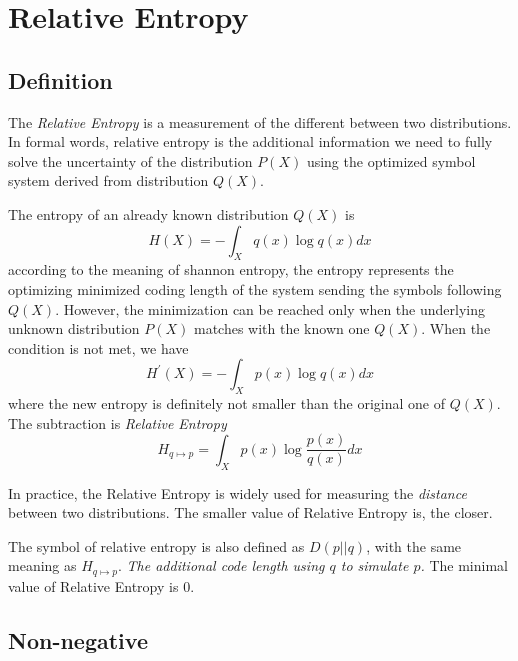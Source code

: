 \documentclass[a4paper]{article}
\begin{document}
\section{Relative Entropy}

\subsection{Definition}

The \emph{Relative Entropy} is a measurement of the different between two distributions.
In formal words, relative entropy is the additional information we need to fully solve the uncertainty of the distribution $P(X)$ using the optimized symbol system derived from distribution $Q(X)$.

The entropy of an already known distribution $Q(X)$ is
\begin{equation*}
    H(X) = - \int_{X} q(x) \log{q(x)} dx
\end{equation*}
according to the meaning of shannon entropy, the entropy represents the optimizing minimized coding length of the system sending the symbols following $Q(X)$.
However, the minimization can be reached only when the underlying unknown distribution $P(X)$ matches with the known one $Q(X)$.
When the condition is not met, we have
\begin{equation}
    H^{'}(X) = - \int_{X} p(x) \log{q(x)} dx
\end{equation}
where the new entropy is definitely not smaller than the original one of $Q(X)$.
The subtraction is \emph{Relative Entropy}
\begin{equation}
    H_{q \mapsto p} = \int_{X} p(x) \log{\frac{p(x)}{q(x)}} dx
    \label{eq: Relative Entropy}
\end{equation}

In practice, the Relative Entropy is widely used for measuring the \emph{distance} between two distributions.
The smaller value of Relative Entropy is, the closer.

The symbol of relative entropy is also defined as $D(p||q)$, with the same meaning as $H_{q \mapsto p}$.
\emph{The additional code length using $q$ to simulate $p$.}
The minimal value of Relative Entropy is $0$.

\subsection{Non-negative}
\end{document}
